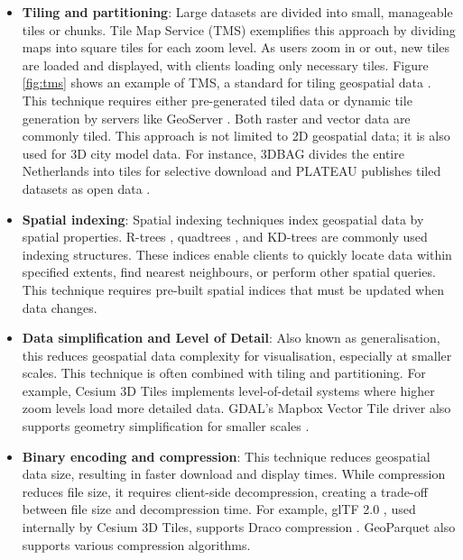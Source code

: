 \begin{itemize}
  \item \textbf{Tiling and partitioning}: Large datasets are divided into small, manageable tiles or chunks. Tile Map Service (TMS) exemplifies this approach by dividing maps into square tiles for each zoom level. As users zoom in or out, new tiles are loaded and displayed, with clients loading only necessary tiles. Figure \ref{fig:tms} shows an example of TMS, a standard for tiling geospatial data \citep{tms}. This technique requires either pre-generated tiled data or dynamic tile generation by servers like GeoServer \citep{geoserver}. Both raster and vector data are commonly tiled. This approach is not limited to 2D geospatial data; it is also used for 3D city model data. For instance, 3DBAG divides the entire Netherlands into tiles for selective download \citep{3dbag} and PLATEAU publishes tiled datasets as open data \citep{plateau}.

  \item \textbf{Spatial indexing}: Spatial indexing techniques index geospatial data by spatial properties. R-trees \citep{guttman_1984}, quadtrees \citep{finkel_1974}, and KD-trees \citep{bentley_1975} are commonly used indexing structures. These indices enable clients to quickly locate data within specified extents, find nearest neighbours, or perform other spatial queries. This technique requires pre-built spatial indices that must be updated when data changes.

  \item \textbf{Data simplification and Level of Detail}: Also known as generalisation, this reduces geospatial data complexity for visualisation, especially at smaller scales. This technique is often combined with tiling and partitioning. For example, Cesium 3D Tiles \citep{3d_tiles} implements level-of-detail systems where higher zoom levels load more detailed data. GDAL's Mapbox Vector Tile driver also supports geometry simplification for smaller scales \citep{gdal_mvt}.

  \item \textbf{Binary encoding and compression}: This technique reduces geospatial data size, resulting in faster download and display times. While compression reduces file size, it requires client-side decompression, creating a trade-off between file size and decompression time. For example, glTF 2.0 \citep{gltf_2_0}, used internally by Cesium 3D Tiles, supports Draco compression \citep{draco}. GeoParquet \citep{geoparquet} also supports various compression algorithms.
\end{itemize}

